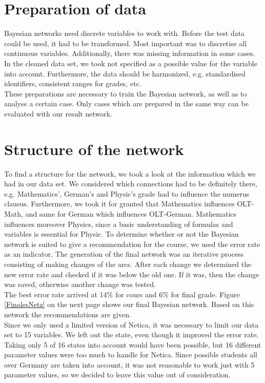 \documentclass[%
	pdftex,
	oneside,        %
	11pt,           %
	parskip=half,   %
	headsepline,    %
	footsepline,    %
	abstracton,     %
	USenglish,      %
	a4paper,        %
]{report}
\begin{document}
\chapter{Preparation of data}
Bayesian networks need discrete variables to work with. Before the test data could be used, it had to be transformed. Most important was to discretise all continuous variables. Additionally, there was missing information in some cases. In the cleaned data set, we took not specified as a possible value for the variable into account. Furthermore, the data should be harmonized, e.g. standardised identifiers, consistent ranges for grades, etc.\\
These preparations are necessary to train the Bayesian network, as well as to analyse a certain case. Only cases which are prepared in the same way can be evaluated with our result network. 

\chapter{Structure of the network}
To find a structure for the network, we took a look at the information which we had in our data set. We considered which connections had to be definitely there, e.g. Mathematics', German's and Physic's grade had to influence the numerus clausus. Furthermore, we took it for granted that Mathematics influences OLT-Math, and same for German which influences OLT-German. Mathematics influences moreover Physics, since a basic understanding of formulas and variables is essential for Physic. To determine whether or not the Bayesian network is suited to give a recommendation for the course, we used the error rate as an indicator. The generation of the final network was an iterative process consisting of making changes of the arcs. After each change we determined the new error rate and checked if it was below the old one. If it was, then the change was saved, otherwise another change was tested.\\
The best error rate arrived at 14\% for cours and 6\% for final grade. Figure \ref{FinalesNetz}  on the next page shows our final Bayesian network. Based on this network the recommendations are given.\\
Since we only used a limited version of Netica, it was necessary to limit our data set to 15 variables. We left out the state, even though it improved the error rate. Taking only 5 of 16 states into account would have been possible, but 16 different parameter values were too much to handle for Netica. Since possible students all over Germany are taken into account, it was not reasonable to work just with 5 parameter values, so we decided to leave this value out of consideration.
\end{document}
